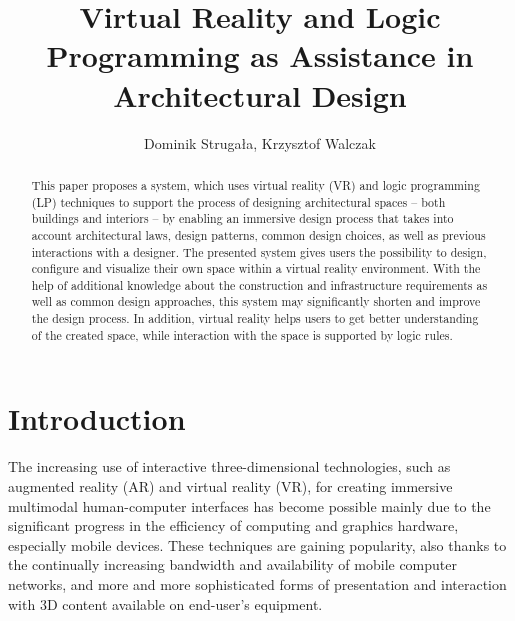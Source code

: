 \documentclass[runningheads]{llncs}
\begin{document}
%
\title{Virtual Reality and Logic Programming as Assistance in Architectural Design}
%
%
\author{Dominik Struga\l{}a, Krzysztof Walczak}
%
%
%
%
\maketitle              %
%
\begin{abstract}
This paper proposes a system, which uses virtual reality (VR) and logic programming (LP) techniques to support the process of designing architectural spaces -- both buildings and interiors -- by enabling an immersive design process that takes into account architectural laws, design patterns, common design choices, as well as previous interactions with a designer. The presented system gives users the possibility to design, configure and visualize their own space within a virtual reality environment. With the help of additional knowledge about the construction and infrastructure requirements as well as common design approaches, this system may significantly shorten and improve the design process. In addition, virtual reality helps users to get better understanding of the created space, while interaction with the space is supported by logic rules.

\end{abstract}
%
%
%
\section{Introduction}
The increasing use of interactive three-dimensional technologies, such as augmented reality (AR) and virtual reality (VR), for creating immersive multimodal human-computer interfaces has become possible mainly due to the significant progress in the efficiency of computing and graphics hardware, especially mobile devices. These techniques are gaining popularity, also thanks to the continually increasing bandwidth and availability of mobile computer networks, and more and more sophisticated forms of presentation and interaction with 3D content available on end-user's equipment.
\end{document}
